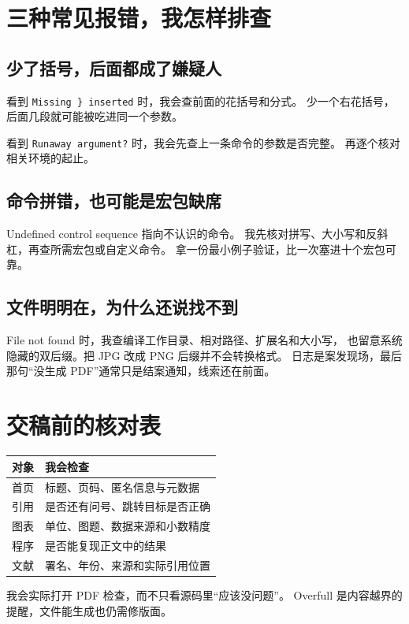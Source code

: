 \section{三种常见报错，我怎样排查}
\subsection{少了括号，后面都成了嫌疑人}
看到 \verb|Missing } inserted| 时，我会查前面的花括号和分式。
少一个右花括号，后面几段就可能被吃进同一个参数。

看到 \verb|Runaway argument?| 时，我会先查上一条命令的参数是否完整。
再逐个核对相关环境的起止。

\subsection{命令拼错，也可能是宏包缺席}
Undefined control sequence 指向不认识的命令。
我先核对拼写、大小写和反斜杠，再查所需宏包或自定义命令。
拿一份最小例子验证，比一次塞进十个宏包可靠。

\subsection{文件明明在，为什么还说找不到}
File not found 时，我查编译工作目录、相对路径、扩展名和大小写，
也留意系统隐藏的双后缀。把 JPG 改成 PNG 后缀并不会转换格式。
日志是案发现场，最后那句“没生成 PDF”通常只是结案通知，线索还在前面。

\section{交稿前的核对表}
\begin{center}
\begin{tabular}{ll}
\toprule
对象 & 我会检查 \\
\midrule
首页 & 标题、页码、匿名信息与元数据 \\
引用 & 是否还有问号、跳转目标是否正确 \\
图表 & 单位、图题、数据来源和小数精度 \\
程序 & 是否能复现正文中的结果 \\
文献 & 署名、年份、来源和实际引用位置 \\
\bottomrule
\end{tabular}
\end{center}
我会实际打开 PDF 检查，而不只看源码里“应该没问题”。
Overfull 是内容越界的提醒，文件能生成也仍需修版面。


